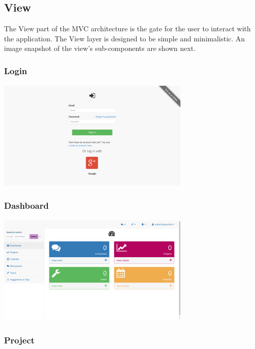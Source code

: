 \subsection{View} %
The View part of the MVC architecture is the gate for the user to interact with the application. The View layer is designed to be simple and minimalistic. An image snapshot of the view's sub-components are shown next.
\subsubsection{Login}

\begin{center}
\includegraphics[height=200px, width=350px]{./img/dsgn_img/login.png}
	
\end{center}

\subsubsection{Dashboard}

\begin{center}
\includegraphics[height=200px, width=350px]{./img/dsgn_img/dashboard.png}
	
\end{center}

\subsubsection{Project}

